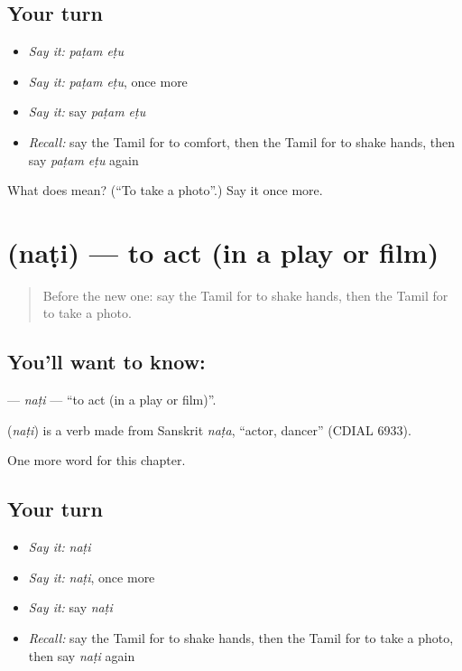 \subsection*{Your turn}
\begin{itemize}
\raggedright
  \item \emph{Say it:} \emph{paṭam eṭu}
  \item \emph{Say it:} \emph{paṭam eṭu}, once more
  \item \emph{Say it:} say \emph{paṭam eṭu}
  \item \emph{Recall:} say the Tamil for to comfort, then the Tamil for to shake hands, then say \emph{paṭam eṭu} again
\end{itemize}

\begin{tcolorbox}[breakable,colback=teal!4,colframe=teal!35!black,title={Before you move on}]
What does   mean? (\textquotedblleft{}To take a photo\textquotedblright{}.) Say it once more.
\end{tcolorbox}
\section[\texorpdfstring{\ta{நடி} (naṭi)}{நடி (naṭi)}]{ (naṭi) — to act (in a play or film)}

\label{lesson:TA-C259-nati}



\begin{quote}
Before the new one: say the Tamil for to shake hands, then the Tamil for to take a photo.
\end{quote}

\subsection*{You'll want to know: }
\textbf{} — \emph{naṭi} — \textquotedblleft{}to act (in a play or film)\textquotedblright{}.

\begin{cousinweb}
\textbf{} (\emph{naṭi}) is a verb made from Sanskrit \emph{naṭa}, \textquotedblleft{}actor, dancer\textquotedblright{} (CDIAL 6933).
\end{cousinweb}

\begin{grammarlens}[title={What you've built}]
One more word for this chapter.
\end{grammarlens}

\subsection*{Your turn}
\begin{itemize}
\raggedright
  \item \emph{Say it:} \emph{naṭi}
  \item \emph{Say it:} \emph{naṭi}, once more
  \item \emph{Say it:} say \emph{naṭi}
  \item \emph{Recall:} say the Tamil for to shake hands, then the Tamil for to take a photo, then say \emph{naṭi} again
\end{itemize}

